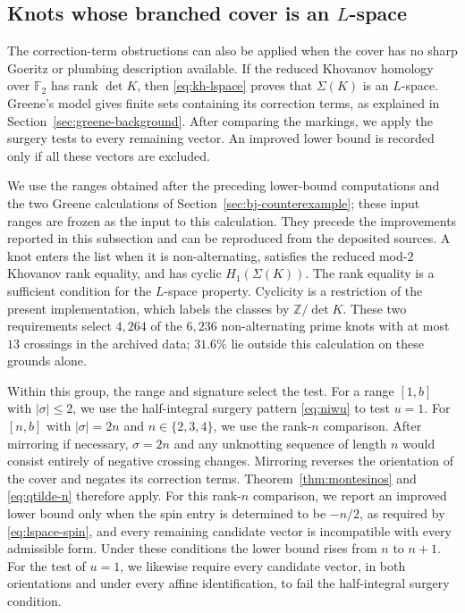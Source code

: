 \documentclass[12pt, oneside]{amsart}
\newcommand{\bbz}{{\mathbb Z}}
\newcommand{\dbc}{\Sigma}
\begin{document}
\subsection{Knots whose branched cover is an \texorpdfstring{$L$}{L}-space}\label{sec:sweep}

The correction-term obstructions can also be applied when the cover has no
sharp Goeritz or plumbing description available. If the reduced Khovanov
homology over $\mathbb F_2$ has rank $\det K$, then \eqref{eq:kh-lspace} proves
that $\dbc(K)$ is an $L$-space. Greene's model gives finite sets containing its
correction terms, as explained in Section~\ref{sec:greene-background}. After
comparing the markings, we apply the surgery tests to every remaining vector.
An improved lower bound is recorded only if all these vectors are excluded.

We use the ranges obtained after the preceding lower-bound computations and the
two Greene calculations of Section~\ref{sec:bj-counterexample}; these input
ranges are frozen as the input to this calculation. They precede the
improvements reported in this subsection and can be reproduced from the
deposited sources. A knot enters
the list when it is non-alternating, satisfies the reduced mod-$2$ Khovanov rank
equality, and has cyclic $H_1(\dbc(K))$. The rank equality is a sufficient
condition for the $L$-space property. Cyclicity is a restriction of the
present implementation, which labels the classes by $\bbz/\det K$.
These two requirements select $4{,}264$ of the $6{,}236$ non-alternating prime
knots with at most $13$ crossings in the archived data; $31.6\%$ lie outside
this calculation on these grounds alone.

Within this group, the range and signature select the test. For a range $[1,b]$ with
$|\sigma|\le2$, we use the half-integral surgery pattern \eqref{eq:niwu} to
test $u=1$. For $[n,b]$ with $|\sigma|=2n$ and $n\in\{2,3,4\}$, we use the
rank-$n$ comparison. After mirroring if necessary, $\sigma=2n$ and any
unknotting sequence of length $n$ would consist entirely of negative crossing
changes. Mirroring reverses the orientation of the cover and negates its
correction terms. Theorem~\ref{thm:montesinos} and \eqref{eq:qtilde-n}
therefore apply. For this rank-$n$ comparison, we report an improved lower
bound only when the spin entry is determined to be $-n/2$, as required by
\eqref{eq:lspace-spin}, and every remaining candidate vector is incompatible
with every admissible form. Under these conditions the lower bound rises
from $n$ to $n+1$. For the test of $u=1$, we likewise require every candidate
vector, in both orientations and under every affine identification, to fail
the half-integral surgery condition.
\end{document}
